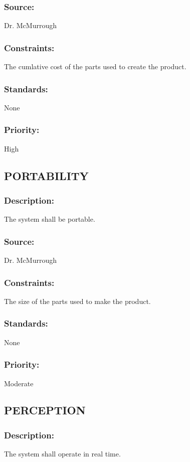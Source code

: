 \subsubsection{Source:} 
	{Dr. McMurrough}
\subsubsection{Constraints:} 
	{The cumlative cost of the parts used to create the product.}
\subsubsection{Standards:} 
	{None}
\subsubsection{Priority:} 
	{High}
\newline
\newline

\subsection{\text PORTABILITY}
\subsubsection{Description:} 
	{The system shall be portable.}
\subsubsection{Source:} 
	{Dr. McMurrough}
\subsubsection{Constraints:} 
	{The size of the parts used to make the product.}
\subsubsection{Standards:} 
	{None}
\subsubsection{Priority:} 
	{Moderate}
\newline
\newline
	
\subsection{\text PERCEPTION}
\subsubsection{Description:} 
	{The system shall operate in real time.}
